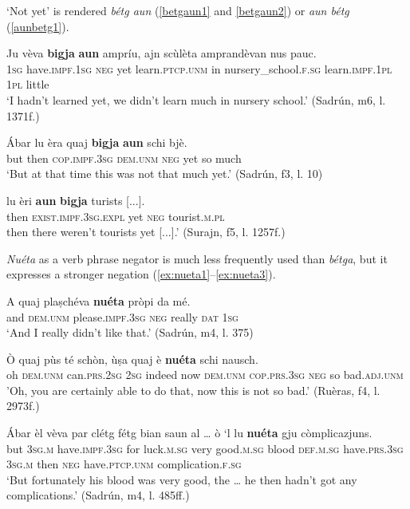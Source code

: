 `Not yet' is rendered \textit{bétg aun} (\ref{betgaun1} and \ref{betgaun2}) or \textit{aun bétg} (\ref{aunbetg1}).

\ea
\label{betgaun1}
\gll  Ju vèva \textbf{bigja} \textbf{aun} ampríu, ajn scùlèta amprandèvan nus pauc.\\
\textsc{1sg} have.\textsc{impf.1sg} \textsc{neg} yet  learn.\textsc{ptcp.unm} in  nursery\_school.\textsc{f.sg} learn.\textsc{impf.1pl}  \textsc{1pl} little \\
\glt `I hadn’t learned yet, we didn’t learn much in nursery school.' (Sadrún, m6, l. 1371f.)
\z

\ea
\label{betgaun2}
\gll  Ábar lu èra quaj \textbf{bigja} \textbf{aun} schi bjè.  \\
but then \textsc{cop.impf.3sg} \textsc{dem.unm} \textsc{neg} yet so much  \\
\glt `But at that time this was not that much yet.' (Sadrún, f3, l. 10)
\z

\ea
\label{aunbetg1}
\gll    [...] lu èri \textbf{aun} \textbf{bigja} turists [...]. \\
{} then \textsc{exist.impf.3sg.expl} yet \textsc{neg} tourist.\textsc{m.pl}\\
\glt [...]  then there weren’t tourists yet [...].' (Surajn, f5, l. 1257f.)
\z


\textit{Nuéta} as a verb phrase negator is much less frequently used than \textit{bétga}, but it expresses a stronger negation (\ref{ex:nueta1}--\ref{ex:nueta3}).

\ea
\label{ex:nueta1}
\gll A quaj plaṣchéva \textbf{nuéta} pròpi da mé. \\
and \textsc{dem.unm} please.\textsc{impf.3sg} \textsc{neg} really \textsc{dat} \textsc{1sg}\\
\glt `And I really didn’t  like that.' (Sadrún, m4, l. 375)
\z

\ea
\label{ex:nueta2}
	\gll Ò quaj pùs té schòn, ùṣa quaj è \textbf{nuéta} schi nausch.\\
oh \textsc{dem.unm} can.\textsc{prs.2sg} \textsc{2sg} indeed now \textsc{dem.unm} \textsc{cop.prs.3sg} \textsc{neg} so bad.\textsc{adj.unm}\\
\glt 'Oh, you are certainly able to do that, now this is not so bad.' (Ruèras, f4, l. 2973f.)
\z

\ea
\label{ex:nueta3}
\gll  Ábar èl vèva par clétg fétg bian saun al … ò `l lu \textbf{nuéta} gju còmplicazjuns.  \\
but  \textsc{3sg.m} have.\textsc{impf.3sg} for luck.\textsc{m.sg} very good.\textsc{m.sg} blood \textsc{def.m.sg} {} have.\textsc{prs.3sg} \textsc{3sg.m} then \textsc{neg} have.\textsc{ptcp.unm} complication.\textsc{f.sg}\\
\glt `But fortunately his blood was very good, the … he then hadn’t got any complications.' (Sadrún, m4, l. 485ff.)
\z

